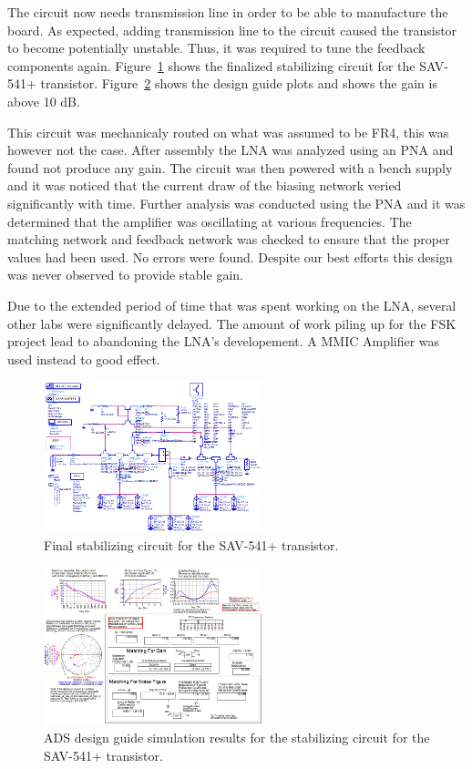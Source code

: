 \documentclass[conference]{IEEEtran}
\begin{document}
The circuit now needs transmission line in order to be able to manufacture the board.  As expected, adding transmission line to the circuit caused the transistor to become potentially unstable.  Thus, it was required to tune the feedback components again.  Figure~\ref{fig:finalstabcircuit} shows the finalized stabilizing circuit for the SAV-541+ transistor.  Figure~\ref{fig:finalstabsimulation} shows the design guide plots and shows the gain is above 10 dB.

This circuit was mechanicaly routed on what was assumed to be FR4, this was however not the case. After assembly the LNA was analyzed using an PNA and found not produce any gain. The circuit was then powered with a bench supply and it was noticed that the current draw of the biasing network veried significantly with time. Further analysis was conducted using the PNA and it was determined that the amplifier was oscillating at various frequencies. The matching network and feedback network was checked to ensure that the proper values had been used. No errors were found. Despite our best efforts this design was never observed to provide stable gain.

Due to the extended period of time that was spent working on the LNA, several other labs were significantly delayed. The amount of work piling up for the FSK project lead to abandoning the LNA's developement. A MMIC Amplifier was used instead to good effect. 

\begin{figure}[!h]
\centering
\includegraphics[width=2.5in]{pics/FinalStabilizingCircuit.png}
\caption{Final stabilizing circuit for the SAV-541+ transistor.}
\label{fig:finalstabcircuit}
\end{figure}

\begin{figure}[!h]
\centering
\includegraphics[width=2.5in]{pics/FinalStabilizingSimulation.png}
\caption{ADS design guide simulation results for the stabilizing circuit for the SAV-541+ transistor.}
\label{fig:finalstabsimulation}
\end{figure}
\end{document}
